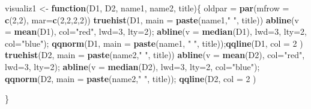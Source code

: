 \documentclass[
]{article}
\newenvironment{Shaded}{\begin{snugshade}}{\end{snugshade}}
\newcommand{\ControlFlowTok}[1]{\textcolor[rgb]{0.13,0.29,0.53}{\textbf{#1}}}
\newcommand{\DataTypeTok}[1]{\textcolor[rgb]{0.13,0.29,0.53}{#1}}
\newcommand{\DecValTok}[1]{\textcolor[rgb]{0.00,0.00,0.81}{#1}}
\newcommand{\KeywordTok}[1]{\textcolor[rgb]{0.13,0.29,0.53}{\textbf{#1}}}
\newcommand{\NormalTok}[1]{#1}
\newcommand{\StringTok}[1]{\textcolor[rgb]{0.31,0.60,0.02}{#1}}
\begin{document}
\begin{Shaded}
\begin{Highlighting}[]
\NormalTok{ visualiz1 <-}\StringTok{ }\ControlFlowTok{function}\NormalTok{(D1, D2, name1, name2, title)\{}
\NormalTok{   oldpar =}\StringTok{ }\KeywordTok{par}\NormalTok{(}\DataTypeTok{mfrow =} \KeywordTok{c}\NormalTok{(}\DecValTok{2}\NormalTok{,}\DecValTok{2}\NormalTok{), }\DataTypeTok{mar=}\KeywordTok{c}\NormalTok{(}\DecValTok{2}\NormalTok{,}\DecValTok{2}\NormalTok{,}\DecValTok{2}\NormalTok{,}\DecValTok{2}\NormalTok{))}
  \KeywordTok{truehist}\NormalTok{(D1, }\DataTypeTok{main =} \KeywordTok{paste}\NormalTok{(name1,}\StringTok{" "}\NormalTok{, title))}
  \KeywordTok{abline}\NormalTok{(}\DataTypeTok{v =} \KeywordTok{mean}\NormalTok{(D1), }\DataTypeTok{col=}\StringTok{"red"}\NormalTok{, }\DataTypeTok{lwd=}\DecValTok{3}\NormalTok{, }\DataTypeTok{lty=}\DecValTok{2}\NormalTok{);}
  \KeywordTok{abline}\NormalTok{(}\DataTypeTok{v =} \KeywordTok{median}\NormalTok{(D1), }\DataTypeTok{lwd=}\DecValTok{3}\NormalTok{, }\DataTypeTok{lty=}\DecValTok{2}\NormalTok{, }\DataTypeTok{col=}\StringTok{"blue"}\NormalTok{);}
  \KeywordTok{qqnorm}\NormalTok{(D1, }\DataTypeTok{main =} \KeywordTok{paste}\NormalTok{(name1, }\StringTok{" "}\NormalTok{, title));}\KeywordTok{qqline}\NormalTok{(D1, }\DataTypeTok{col =} \DecValTok{2}\NormalTok{ )}
  \KeywordTok{truehist}\NormalTok{(D2, }\DataTypeTok{main =} \KeywordTok{paste}\NormalTok{(name2,}\StringTok{" "}\NormalTok{, title))}
  \KeywordTok{abline}\NormalTok{(}\DataTypeTok{v =} \KeywordTok{mean}\NormalTok{(D2), }\DataTypeTok{col=}\StringTok{"red"}\NormalTok{, }\DataTypeTok{lwd=}\DecValTok{3}\NormalTok{, }\DataTypeTok{lty=}\DecValTok{2}\NormalTok{);}
  \KeywordTok{abline}\NormalTok{(}\DataTypeTok{v =} \KeywordTok{median}\NormalTok{(D2), }\DataTypeTok{lwd=}\DecValTok{3}\NormalTok{, }\DataTypeTok{lty=}\DecValTok{2}\NormalTok{, }\DataTypeTok{col=}\StringTok{"blue"}\NormalTok{);}
  \KeywordTok{qqnorm}\NormalTok{(D2, }\DataTypeTok{main =} \KeywordTok{paste}\NormalTok{(name2,}\StringTok{" "}\NormalTok{, title)); }\KeywordTok{qqline}\NormalTok{(D2, }\DataTypeTok{col =} \DecValTok{2}\NormalTok{ )}

\NormalTok{\}}
\end{Highlighting}
\end{Shaded}

\texttt{}~\\
\texttt{}
\end{document}
